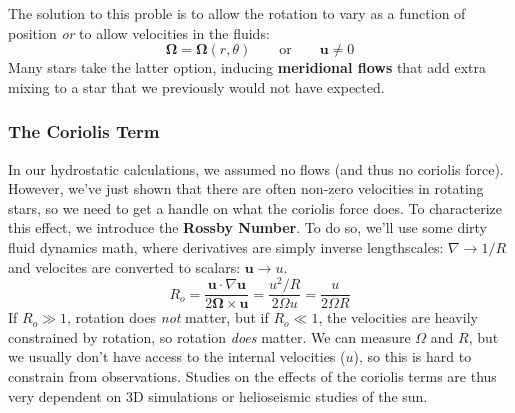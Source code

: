 \documentclass[10pt]{article}
\numberwithin{equation}{section}
\newcommand{\n}{\noindent}
\begin{document}
  \n The solution to this proble is to allow the rotation to vary as a function
  of position \emph{or} to allow velocities in the fluids:
  \begin{equation}
    \label{eq:dr:10} \bm{\Omega} = \bm{\Omega}(r, \theta) \qquad \textrm{or}
    \qquad \mathbf{u} \neq 0
  \end{equation}
  Many stars take the latter option, inducing \textbf{meridional flows} that
  add extra mixing to a star that we previously would not have expected.
  \subsubsection{The Coriolis Term} %
  \label{ssub:the_coriolis_term}
  In our hydrostatic calculations, we assumed no flows (and thus no coriolis
  force). However, we've just shown that there are often non-zero velocities in
  rotating stars, so we need to get a handle on what the coriolis force does.
  To characterize this effect, we introduce the \textbf{Rossby Number}. To do
  so, we'll use some dirty fluid dynamics math, where derivatives are simply
  inverse lengthscales: $\nabla \to 1/R$ and velocites are converted to
  scalars: $\mathbf{u}\to u$.
  \begin{equation}
    \label{eq:rossby:1} R_o = \frac{\mathbf{u}\cdot\nabla\mathbf{u}}{ 2
    \bm{\Omega} \times \mathbf{u}} = \frac{u^2/R}{2\Omega u} = \frac{u}{2\Omega
    R}
  \end{equation}
  If $R_o \gg 1$, rotation does \emph{not} matter, but if $R_o \ll 1$, the
  velocities are heavily constrained by rotation, so rotation \emph{does}
  matter. We can measure $\Omega$ and $R$, but we usually don't have access to 
  the internal velocities ($u$), so this is hard to constrain from observations.
  Studies on the effects of the coriolis terms are thus very dependent on 3D 
  simulations or helioseismic studies of the sun.
\end{document}
